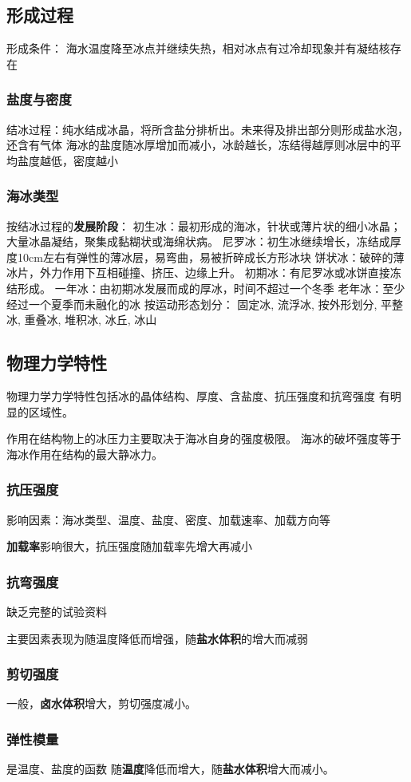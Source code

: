 \subsection{形成过程}
形成条件： 海水温度降至冰点并继续失热，相对冰点有过冷却现象并有凝结核存在
\subsubsection{盐度与密度}
结冰过程：纯水结成冰晶，将所含盐分排析出。未来得及排出部分则形成盐水泡，还含有气体
海冰的盐度随冰厚增加而减小，冰龄越长，冻结得越厚则冰层中的平均盐度越低，密度越小
\subsubsection{海冰类型}
按结冰过程的\textbf{发展阶段}：
初生冰：最初形成的海冰，针状或薄片状的细小冰晶；大量冰晶凝结，聚集成黏糊状或海绵状病。
尼罗冰：初生冰继续增长，冻结成厚度10cm左右有弹性的薄冰层，易弯曲，易被折碎成长方形冰块
饼状冰：破碎的薄冰片，外力作用下互相碰撞、挤压、边缘上升。
初期冰：有尼罗冰或冰饼直接冻结形成。
一年冰：由初期冰发展而成的厚冰，时间不超过一个冬季
老年冰：至少经过一个夏季而未融化的冰
按运动形态划分：
固定冰,
流浮冰,
按外形划分,
平整冰,
重叠冰,
堆积冰,
冰丘,
冰山
\subsection{物理力学特性}
物理力学力学特性包括冰的晶体结构、厚度、含盐度、抗压强度和抗弯强度
有明显的区域性。

作用在结构物上的冰压力主要取决于海冰自身的强度极限。
海冰的破坏强度等于海冰作用在结构的最大静冰力。
\subsubsection{抗压强度}
影响因素：海冰类型、温度、盐度、密度、加载速率、加载方向等

\textbf{加载率}影响很大，抗压强度随加载率先增大再减小
\subsubsection{抗弯强度}
缺乏完整的试验资料

主要因素表现为随温度降低而增强，随\textbf{盐水体积}的增大而减弱
\subsubsection{剪切强度}
一般，\textbf{卤水体积}增大，剪切强度减小。
\subsubsection{弹性模量}
是温度、盐度的函数
随\textbf{温度}降低而增大，随\textbf{盐水体积}增大而减小。

